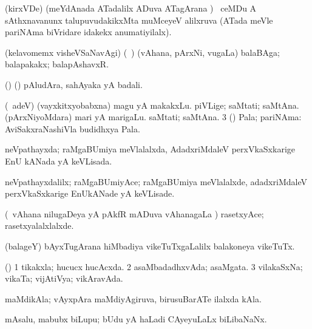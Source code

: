\bentry
{}
\gl{\gu}
\bmng
(kirxVDe) (meYdAnada ATadalilx ADuva ATagArana \vi) \sA\ ceMDu A sAthxnavanunx talupuvudakikxMta muMceyeV alilxruva (ATada meVle pariNAma biVridare idakekx anumatiyilalx). 
\emng
\eentry

\bentry
{}
\gl{\nA}
\bmng
(kelavomemx visheVSaNavAgi) (\kanmu\ \birx) (vAhana, pArxNi, \mo vugaLa) balaBAga; balapakakx; balapAshavxR. 
\emng
\eentry

\bentry
{}
\gl{\nA}
\bmng
(\AseTxrXV) (\AmA) pAludAra, sahAyaka yA badali. 
\emng
\eentry

\bentry
{}
\gl{\nA}
\bmng
(\bava\ adeV) 
\bnum
{} (vayxkitxyobabxna) 
\banum
{} magu yA makakxLu. 
 piVLige; saMtati; saMtAna. 
\eanum
\numie
{} (pArxNiyoMdara) 
\banum
{} mari yA marigaLu. 
 saMtati; saMtAna. 
\eanum
\numie
\num{3} (\rUpa) Pala; pariNAma:  AviSakxraNashiVla budidhxya Pala. 
\enum
\emng
\eentry

\bentry
{}
\gl{\gu}
\bmng
neVpathayxda; raMgaBUmiya meVlalalxda, AdadxriMdaleV perxVkaSxkarige EnU kANada yA keVLisada. 
\emng
\eentry

\bentry
{}
\gl{\kirxvi}
\bmng
neVpathayxdalilx; raMgaBUmiyAce; raMgaBUmiya meVlalalxde, adadxriMdaleV perxVkaSxkarige EnUkANade yA keVLisade. 
\emng
\eentry

\bentry
{}
\gl{\kirxvi}
\bmng
(\kanmu\ vAhana nilugaDeya yA pAkfR mADuva vAhanagaLa \vi) rasetxyAce; rasetxyalalxlalxde. 
\emng
\eentry

\bentry
{}
\gl{\nA}
\bmng
(balageY) bAyxTugArana hiMbadiya vikeTuTxgaLalilx balakoneya vikeTuTx. 
\emng
\eentry

\bentry
{}
\gl{\gu}
\bmng
(\ashi) 
\bnum
\num{1} tikakxla; hucucx hucAcxda. 
\num{2} asaMbadadhxvAda; asaMgata. 
\num{3} vilakaSxNa; vikaTa; vijAtiVya; vikAravAda. 
\enum
\emng
\eentry

\bentry
{}
\gl{\nA}
\bmng
maMdikAla; vAyxpAra maMdiyAgiruva, birusuBarATe ilalxda kAla. 
\emng
\eentry

\bentry
{}
\gl{\nA}
\bmng
mAsalu, mabubx biLupu; bUdu yA haLadi CAyeyuLaLx biLibaNaNx. 
\emng
\eentry

